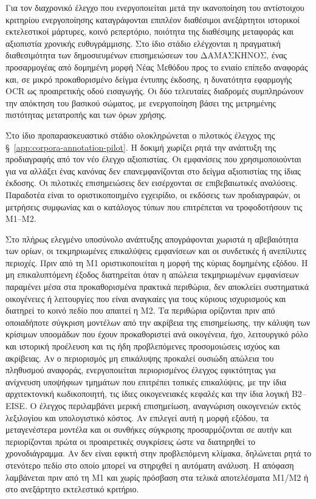 \documentclass[11pt,a4paper]{article}
\begin{document}
Για τον διαχρονικό έλεγχο που ενεργοποιείται μετά την ικανοποίηση του αντίστοιχου κριτηρίου ενεργοποίησης καταγράφονται επιπλέον διαθέσιμοι ανεξάρτητοι ιστορικοί εκτελεστικοί μάρτυρες, κοινό ρεπερτόριο, ποιότητα της διαθέσιμης μεταφοράς και αξιοπιστία χρονικής ευθυγράμμισης. Στο ίδιο στάδιο ελέγχονται η πραγματική διαθεσιμότητα των δημοσιευμένων επισημειώσεων του ΔΑΜΑΣΚΗΝΟΣ, ένας προσαρμογέας από δομημένη μορφή Νέας Μεθόδου προς το ενιαίο επίπεδο αναφοράς και, σε μικρό προκαθορισμένο δείγμα έντυπης έκδοσης, η δυνατότητα εφαρμογής OCR ως προαιρετικής οδού εισαγωγής. Οι δύο τελευταίες διαδρομές συμπληρώνουν την απόκτηση του βασικού σώματος, με ενεργοποίηση βάσει της μετρημένης πιστότητας μετατροπής και των όρων χρήσης.

Στο ίδιο προπαρασκευαστικό στάδιο ολοκληρώνεται ο πιλοτικός έλεγχος της §~\ref{app:corpora-annotation-pilot}. Η δοκιμή χωρίζει ρητά την ανάπτυξη της προδιαγραφής από τον νέο έλεγχο αξιοπιστίας. Οι εμφανίσεις που χρησιμοποιούνται για να αλλάξει ένας κανόνας δεν επανεμφανίζονται στο δείγμα αξιοπιστίας της ίδιας έκδοσης. Οι πιλοτικές επισημειώσεις δεν εισέρχονται σε επιβεβαιωτικές αναλύσεις. Παραδοτέα είναι το οριστικοποιημένο εγχειρίδιο, οι εκδόσεις των προδιαγραφών, οι μετρήσεις συμφωνίας και ο κατάλογος τύπων που επιτρέπεται να τροφοδοτήσουν τις M1--M2.

Στο πλήρως ελεγμένο υποσύνολο ανάπτυξης απογράφονται χωριστά η αβεβαιότητα των ορίων, οι τεκμηριωμένες επικαλύψεις εμφανίσεων και οι συνδετικές ή ανεπίλυτες περιοχές. Πριν από τη M1 οριστικοποιείται η μορφή της κύριας δομημένης εξόδου. Η μη επικαλυπτόμενη έξοδος διατηρείται όταν η απώλεια τεκμηριωμένων εμφανίσεων παραμένει μέσα στα προκαθορισμένα πρακτικά περιθώρια, δεν αποκλείει συστηματικά οικογένειες ή λειτουργίες που είναι αναγκαίες για τους κύριους ισχυρισμούς και διατηρεί το κοινό πεδίο που απαιτεί η M2. Τα περιθώρια ορίζονται πριν από οποιαδήποτε σύγκριση μοντέλων από την ακρίβεια της επισημείωσης, την κάλυψη των κρίσιμων υποομάδων που έχουν προκαθοριστεί ανά οικογένεια, ήχο, λειτουργικό ρόλο και ιστορική προέλευση και τις ήδη προβλεπόμενες προσομοιώσεις ισχύος και ακρίβειας. Αν ο περιορισμός μη επικάλυψης προκαλεί ουσιώδη απώλεια του πληθυσμού αναφοράς, ενεργοποιείται περιορισμένος έλεγχος εφικτότητας για ανίχνευση υποψήφιων τμημάτων που επιτρέπει τοπικές επικαλύψεις, με την ίδια αρχιτεκτονική κωδικοποιητή, τις ίδιες οικογενειακές κεφαλές και την ίδια λογική B2--EISE. Ο έλεγχος περιλαμβάνει μερική επισημείωση, αναγνώριση οικογενειών εκτός λεξιλογίου και υπολογιστικό κόστος. Αν επιλεγεί αυτή η μορφή εξόδου, τα μεταγενέστερα μοντέλα και οι συνθήκες σύγκρισης προσαρμόζονται σε αυτήν και περιορίζονται πρώτα οι προαιρετικές συγκρίσεις ώστε να διατηρηθεί το χρονοδιάγραμμα. Αν δεν είναι εφικτή στην προβλεπόμενη κλίμακα, δηλώνεται ρητά το στενότερο πεδίο στο οποίο μπορεί να στηριχθεί η αυτόματη ανάλυση. Η απόφαση λαμβάνεται πριν από τη M1 και χωρίς πρόσβαση στα τελικά αποτελέσματα M1/M2 ή στο ανεξάρτητο εκτελεστικό κριτήριο.
\end{document}
